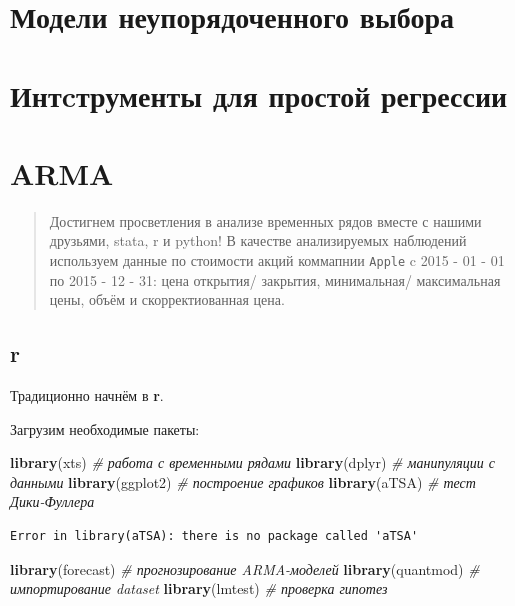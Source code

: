 \documentclass[]{book}
\newenvironment{Shaded}{\begin{snugshade}}{\end{snugshade}}
\newcommand{\CommentTok}[1]{\textcolor[rgb]{0.56,0.35,0.01}{\textit{#1}}}
\newcommand{\KeywordTok}[1]{\textcolor[rgb]{0.13,0.29,0.53}{\textbf{#1}}}
\newcommand{\NormalTok}[1]{#1}
\begin{document}
\hypertarget{disordered}{%
\chapter{Модели неупорядоченного выбора}\label{disordered}}

\hypertarget{instruments}{%
\chapter{Интcтрументы для простой регрессии}\label{instruments}}

\hypertarget{arma}{%
\chapter{ARMA}\label{arma}}

\begin{quote}
Достигнем просветления в анализе временных рядов вместе с нашими друзьями, stata, r и python!
В качестве анализируемых наблюдений используем данные по стоимости акций коммапнии \texttt{Apple} c 2015 - 01 - 01 по 2015 - 12 - 31: цена открытия/ закрытия, минимальная/ максимальная цены, объём и скорректиованная цена.
\end{quote}

\hypertarget{r-2}{%
\section{r}\label{r-2}}

Традиционно начнём в \textbf{r}.

Загрузим необходимые пакеты:

\begin{Shaded}
\begin{Highlighting}[]
\KeywordTok{library}\NormalTok{(xts) }\CommentTok{# работа с временными рядами}
\KeywordTok{library}\NormalTok{(dplyr) }\CommentTok{# манипуляции с данными}
\KeywordTok{library}\NormalTok{(ggplot2) }\CommentTok{# построение графиков}
\KeywordTok{library}\NormalTok{(aTSA) }\CommentTok{# тест Дики-Фуллера}
\end{Highlighting}
\end{Shaded}

\begin{verbatim}
Error in library(aTSA): there is no package called 'aTSA'
\end{verbatim}

\begin{Shaded}
\begin{Highlighting}[]
\KeywordTok{library}\NormalTok{(forecast) }\CommentTok{# прогнозирование ARMA-моделей}
\KeywordTok{library}\NormalTok{(quantmod) }\CommentTok{# импортирование dataset}
\KeywordTok{library}\NormalTok{(lmtest) }\CommentTok{# проверка гипотез}
\end{Highlighting}
\end{Shaded}
\end{document}
